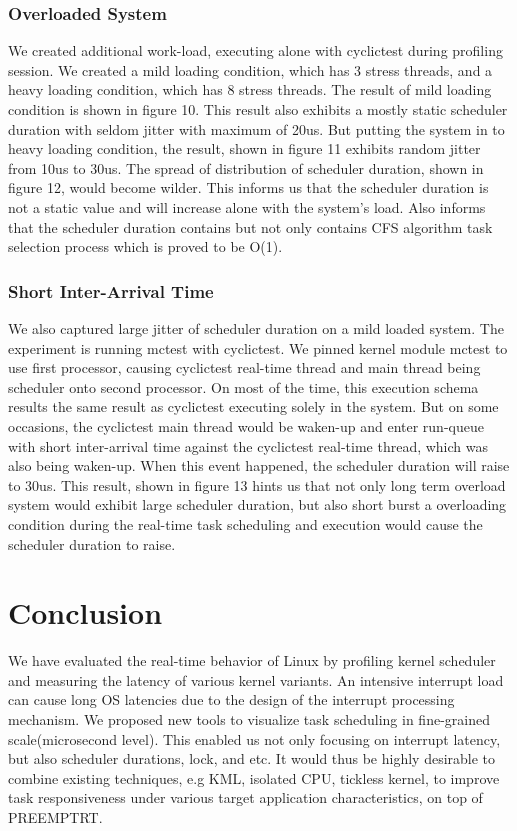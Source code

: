 \documentclass[conference]{IEEEtran}
\begin{document}
\subsubsection{Overloaded System}

    We created additional work-load, executing alone with cyclictest during profiling session. We created a mild loading
    condition, which has 3 stress threads, and a heavy loading condition, which has 8 stress threads. The result of mild
    loading condition is shown in figure 10. This result also exhibits a mostly static scheduler duration with seldom
    jitter with maximum of 20us. But putting the system in to heavy loading condition, the result, shown in figure 11
    exhibits random jitter from 10us to 30us. The spread of distribution of scheduler duration, shown in figure 12,
    would become wilder. This informs us that the scheduler duration is not a static value and will increase alone with
    the system's load. Also informs that the scheduler duration contains but not only contains CFS algorithm task
    selection process which is proved to be O(1).

\subsubsection{Short Inter-Arrival Time}

    We also captured large jitter of scheduler duration on a mild loaded system. The experiment is running mctest with
    cyclictest. We pinned kernel module mctest to use first processor, causing cyclictest real-time thread and main
    thread being scheduler onto second processor. On most of the time, this execution schema results the same result as
    cyclictest executing solely in the system. But on some occasions, the cyclictest main thread would be waken-up and
    enter run-queue with short inter-arrival time against the cyclictest real-time thread, which was also being
    waken-up. When this event happened, the scheduler duration will raise to 30us. This result, shown in figure 13 hints
    us that not only long term overload system would exhibit large scheduler duration, but also short burst a
    overloading condition during the real-time task scheduling and execution would cause the scheduler duration to
    raise.

\section{Conclusion}

    We have evaluated the real-time behavior of Linux by profiling kernel scheduler and measuring the latency of various
    kernel variants. An intensive interrupt load can cause long OS latencies due to the design of the interrupt
    processing mechanism. We proposed new tools to visualize task scheduling in fine-grained scale(microsecond level).
    This enabled us not only focusing on interrupt latency, but also scheduler durations, lock, and etc. It would thus
    be highly desirable to combine existing techniques, e.g KML, isolated CPU, tickless kernel, to improve task
    responsiveness under various target application characteristics, on top of PREEMPT\textunderscore RT.



\end{document}
